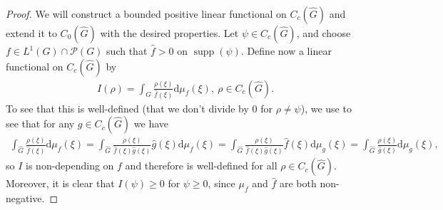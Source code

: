 \documentclass[10pt,twoside,openany,final]{memoir}
\theoremstyle{definition}
\theoremstyle{Break}
\newcommand{\G}{\widehat{G}}
\renewcommand{\P}{\mathcal{P}}
\DeclareMathOperator{\supp}{supp}
\renewcommand{\d}{\mathrm{d}}
\begin{document}
\begin{proof}
	We will construct a bounded positive linear functional on $C_c(\G)$ and extend it to $C_0(\G)$ with the desired properties. Let $\psi \in C_c(\G)$, and choose $f \in L^1(G) \cap \P(G)$ such that $\widehat{f}>0$ on $\supp(\psi)$. Define now a linear functional on $C_c(\G)$ by
	\begin{align*}
		I(\rho)=\int_{\G} \frac{\rho(\xi)}{\widehat{f}(\xi)} \d \mu_f(\xi), \ \rho \in C_c(\G).
	\end{align*}
	To see that this is well-defined (that we don't divide by $0$ for $\rho \neq \psi$), we use  to see that for any $g \in C_c(\G)$ we have
	\begin{align*}
		\int_{\G}\frac{\rho(\xi)}{\widehat{f}(\xi)}\d \mu_f(\xi)=\int_{\G}\frac{\rho(\xi)}{\widehat{f}(\xi)\widehat{g}(\xi)} \widehat{g}(\xi)\d \mu_f(\xi)=\int_{\G}\frac{\rho(\xi)}{\widehat{f}(\xi)\widehat{g}(\xi)} \widehat{f}(\xi)\d \mu_g(\xi)=\int_{\G}\frac{\rho(\xi)}{\widehat{g}(\xi)}\d \mu_{g}(\xi),
	\end{align*}
	so $I$ is non-depending on $f$ and therefore is well-defined for all $\rho \in C_c(\G)$. Moreover, it is clear that $I(\psi)\geq 0$ for $\psi \geq 0$, since  $\mu_f$ and $\widehat{f}$ are both non-negative.


\end{proof}
\end{document}
